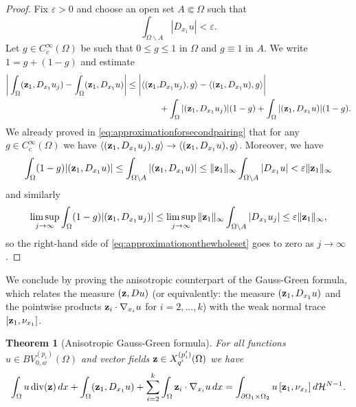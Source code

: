 \documentclass[reqno,12pt]{amsart}
\def\z{{\bf z}}
\newtheorem{theorem}{Theorem}[section]
\numberwithin{equation}{section}
\begin{document}
\begin{proof}
Fix $\varepsilon > 0$ and choose an open set $A \Subset \Omega$ such that 
$$\int_{\Omega \backslash A} |D_{x_1} u| < \varepsilon.$$
Let $g \in C_c^\infty(\Omega)$ be such that $0 \leq g \leq 1$ in $\Omega$ and $g \equiv 1$ in $A$. We write $1 = g + (1 - g)$ and estimate
\begin{align}\label{eq:approximationonthewholeset}
\bigg| \int_\Omega (\z_1, D_{x_1} u_j) - \int_\Omega (\z_1, D_{x_1} u) \bigg| \leq \bigg| \langle (\z_1, &D_{x_1} u_j), g \rangle -  \langle (\z_1, D_{x_1} u), g \rangle  \bigg| \\
&+ \int_\Omega |(\z_1, D_{x_1} u_j)| (1-g) + \int_\Omega |(\z_1, D_{x_1} u)| (1-g).
\end{align}
We already proved in \eqref{eq:approximationforsecondpairing} that for any $g \in C_c^\infty(\Omega)$ we have $\langle (\z_1, D_{x_1} u_j), g \rangle \rightarrow \langle (\z_1, D_{x_1} u), g \rangle$. Moreover, we have 
$$\int_\Omega (1-g) |(\z_1, D_{x_1} u)| \leq \int_{\Omega \backslash A} |(\z_1, D_{x_1} u)| \leq \| \mathbf{z}_1 \|_\infty \int_{\Omega \backslash A} |D_{x_1} u| < \varepsilon \| \mathbf{z}_1 \|_\infty$$
and similarly
$$\limsup_{j \rightarrow \infty} \int_\Omega (1-g) |(\z_1, D_{x_1} u_j)| \leq \limsup_{j \rightarrow \infty} \| \mathbf{z}_1 \|_\infty \int_{\Omega \backslash A} |D_{x_1} u_j| \leq \varepsilon \| \mathbf{z}_1 \|_\infty ,$$
so the right-hand side of \eqref{eq:approximationonthewholeset} goes to zero as $j \rightarrow \infty$.
\end{proof}

We conclude by proving the anisotropic counterpart of the Gauss-Green formula, which relates the measure $(\z, Du)$ (or equivalently: the measure $(\z_1, D_{x_1} u)$ and the pointwise products $\z_i \cdot \nabla_{x_i} u$ for $i = 2, ..., k$) with the weak normal trace $[\z_1, \nu_{x_1}]$.

\begin{theorem}[Anisotropic Gauss-Green formula]\label{thm:anisotropicgaussgreen}
For all functions $u \in BV_{0,w}^{(p_i)}(\Omega)$ and vector fields $\z \in X_{q'}^{(p'_i)}(\Omega)$ we have
\begin{equation}
\int_{\Omega} u \, \mathrm{div}(\z) \, dx + \int_\Omega (\z_1, D_{x_1} u) + \sum_{i=2}^k \int_\Omega \z_i \cdot \nabla_{x_i} u \, dx = \int_{\partial\Omega_1 \times \Omega_2} u \, [\z_1, \nu_{x_1}] \,d\mathcal{H}^{N-1}.
\end{equation}
\end{theorem}
\end{document}
